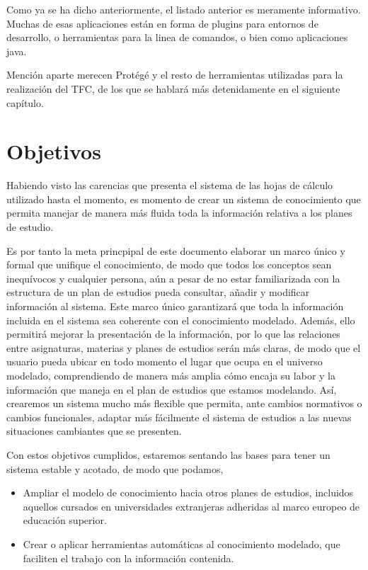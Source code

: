     	Como ya se ha dicho anteriormente, el listado anterior es meramente informativo. Muchas de esas aplicaciones están en forma de plugins para entornos de desarrollo, o herramientas para la linea de comandos, o bien como aplicaciones java. 
    	
    	Mención aparte merecen Protégé y el resto de herramientas utilizadas para la realización del TFC, de los que se hablará más detenidamente en el siguiente capítulo.

      
\section{Objetivos}
  
  	Habiendo visto las carencias que presenta el sistema de las hojas de cálculo utilizado hasta el momento, es momento de crear un sistema de conocimiento que permita manejar de manera más fluida toda la información relativa a los planes de estudio. 
  	
  	Es por tanto la meta princpipal de este documento elaborar un marco único y formal que unifique el conocimiento, de modo que todos los conceptos sean  inequívocos y cualquier persona, aún a pesar de no estar familiarizada con la estructura de un plan de estudios pueda consultar, añadir y modificar información al sistema. Este marco único garantizará que toda la información incluida en el sistema sea coherente con el conocimiento modelado. Además, ello permitirá mejorar la presentación de la información, por lo que las relaciones entre asignaturas, materias y planes de estudios serán más claras, de modo que el usuario pueda ubicar en todo momento el lugar que ocupa en el universo modelado, comprendiendo de manera más amplia cómo encaja su labor y la información que maneja en el plan de estudios que estamos modelando. Así, crearemos un sistema mucho más flexible que permita, ante cambios normativos o cambios funcionales, adaptar más fácilmente el sistema de estudios a las nuevas situaciones cambiantes que se presenten. 
  	
	Con estos objetivos cumplidos, estaremos sentando las bases para tener un sistema estable y acotado, de modo que podamos, 
	\begin{itemize}
		\item Ampliar el modelo de conocimiento hacia otros planes de estudios, incluidos aquellos cursados en universidades extranjeras adheridas al marco europeo de educación superior.
		
		\item Crear o aplicar herramientas automáticas al conocimiento modelado, que faciliten el trabajo con la información contenida.

    \end{itemize}

